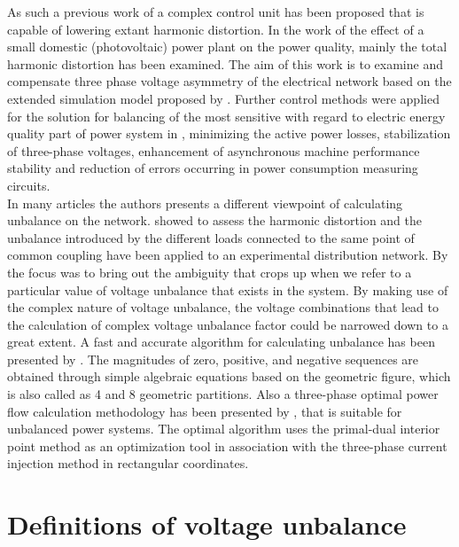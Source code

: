 As such a previous work of \cite{gorbe2012reduction} a complex control unit has been proposed that is capable of lowering extant harmonic distortion. In the work of \cite{Gorbe2014experimental} the effect of a small domestic (photovoltaic) power plant on the power quality, mainly the total harmonic distortion has been examined. The aim of this work is to examine and compensate three phase voltage asymmetry of the electrical network based on the extended simulation model proposed by \cite{gorbe2012reduction}. Further control methods were applied for the solution for balancing of the most sensitive with regard to electric energy quality part of power system in \cite{korovkin2016uimethod}, minimizing the active power losses, stabilization of three-phase voltages, enhancement of asynchronous machine performance stability and reduction of errors occurring in power consumption measuring circuits.\\
In many articles the authors presents a different viewpoint of calculating unbalance on the network. \cite{martin2015unbalance} showed to assess the harmonic distortion and the unbalance introduced by the different loads connected to the same point of common coupling have been applied to an experimental distribution network.  By \cite{kini2007novel} the focus was to bring out the ambiguity that crops up when we refer to a particular value of voltage unbalance that exists in the system. By making use of the complex nature of voltage unbalance, the voltage combinations that lead to the calculation of complex voltage unbalance factor could be narrowed down to a great extent. A fast and accurate algorithm for calculating unbalance has been presented by \cite{wen2014approximate}. The magnitudes of zero, positive, and negative sequences are obtained through simple algebraic equations based on the geometric figure, which is also called as 4 and 8 geometric partitions. Also a three-phase optimal power flow calculation methodology has been presented by \cite{araujo2013three}, that is suitable for unbalanced power systems. The optimal algorithm uses the primal-dual interior point method as an optimization tool in association with the three-phase current injection method in rectangular coordinates.\\

\section{Definitions of voltage unbalance}\label{BASICUNB:sec:DefinitionsofUNB}

